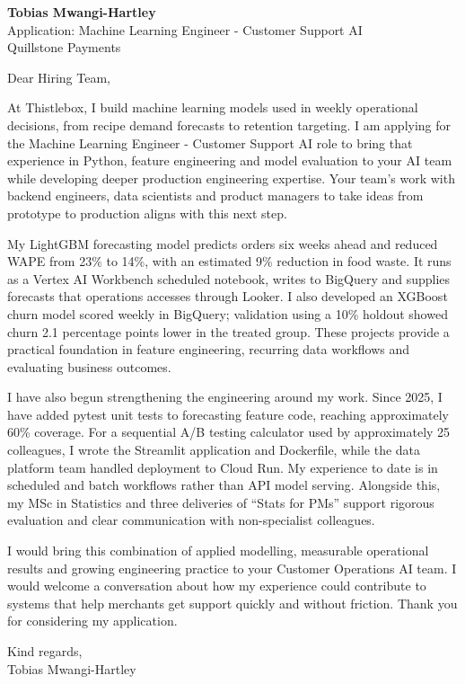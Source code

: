 \documentclass[11pt,a4paper]{article}
\begin{document}
{\large\bfseries\color{primarycolor} Tobias Mwangi-Hartley}\\
Application: Machine Learning Engineer - Customer Support AI\\
Quillstone Payments

Dear Hiring Team,

At Thistlebox, I build machine learning models used in weekly operational decisions, from recipe demand forecasts to retention targeting. I am applying for the Machine Learning Engineer - Customer Support AI role to bring that experience in Python, feature engineering and model evaluation to your AI team while developing deeper production engineering expertise. Your team's work with backend engineers, data scientists and product managers to take ideas from prototype to production aligns with this next step.

My LightGBM forecasting model predicts orders six weeks ahead and reduced WAPE from 23\% to 14\%, with an estimated 9\% reduction in food waste. It runs as a Vertex AI Workbench scheduled notebook, writes to BigQuery and supplies forecasts that operations accesses through Looker. I also developed an XGBoost churn model scored weekly in BigQuery; validation using a 10\% holdout showed churn 2.1 percentage points lower in the treated group. These projects provide a practical foundation in feature engineering, recurring data workflows and evaluating business outcomes.

I have also begun strengthening the engineering around my work. Since 2025, I have added pytest unit tests to forecasting feature code, reaching approximately 60\% coverage. For a sequential A/B testing calculator used by approximately 25 colleagues, I wrote the Streamlit application and Dockerfile, while the data platform team handled deployment to Cloud Run. My experience to date is in scheduled and batch workflows rather than API model serving. Alongside this, my MSc in Statistics and three deliveries of ``Stats for PMs'' support rigorous evaluation and clear communication with non-specialist colleagues.

I would bring this combination of applied modelling, measurable operational results and growing engineering practice to your Customer Operations AI team. I would welcome a conversation about how my experience could contribute to systems that help merchants get support quickly and without friction. Thank you for considering my application.

Kind regards,\\
Tobias Mwangi-Hartley
\end{document}
